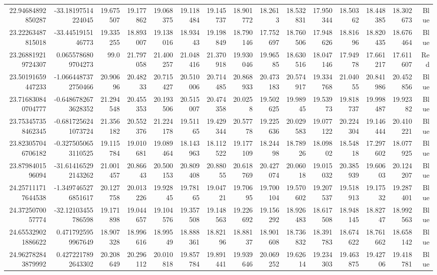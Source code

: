 \begin{center}
\begin{longtable}{rrrrrrrrrrrrrrr}
22.94684892850287 & -33.18197514224045 & 19.675507 & 19.177862 & 19.068375 & 19.118484 & 19.145737 & 18.901772 & 18.2613 & 18.532831 & 17.950344 & 18.50362 & 18.448385 & 18.302673 & Blue \\
23.22263487815018 & -33.4451915146773 & 19.335255 & 18.893007 & 19.138016 & 18.93443 & 19.198849 & 18.790146 & 17.752697 & 18.760506 & 17.948626 & 18.81696 & 18.820435 & 18.676464 & Blue \\
23.268819219724307 & 0.0655786809704273 & 99.0 & 21.797058 & 21.400257 & 21.048416 & 21.370918 & 19.930046 & 19.96585 & 18.630516 & 18.047146 & 17.94978 & 17.661217 & 17.611607 & Red \\
23.50191659447233 & -1.0664487372750466 & 20.90696 & 20.48233 & 20.715427 & 20.510006 & 20.714485 & 20.868933 & 20.473183 & 20.574917 & 19.334768 & 21.04055 & 20.841986 & 20.452856 & Blue \\
23.716830840704777 & -0.6486782673628352 & 21.294548 & 20.455353 & 20.193506 & 20.515007 & 20.474358 & 20.0258 & 19.502625 & 19.98945 & 19.53973 & 19.818737 & 19.998487 & 19.92382 & Blue \\
23.753457358462345 & -0.6817256241073724 & 21.356182 & 20.552376 & 21.224178 & 19.51165 & 19.429344 & 20.57778 & 19.225636 & 20.029583 & 19.077122 & 20.224304 & 19.146444 & 20.410221 & Blue \\
23.823057046706182 & -0.3275050653110525 & 19.115784 & 19.010681 & 19.089464 & 18.143963 & 18.112522 & 19.177109 & 18.24498 & 18.78926 & 18.09802 & 18.54818 & 17.297602 & 18.077925 & Blue \\
23.8798401596094 & -31.614165292143262 & 21.001457 & 20.86643 & 20.500153 & 20.809408 & 20.88055 & 20.618769 & 20.427074 & 20.06018 & 19.015032 & 20.385939 & 19.60603 & 20.124207 & Blue \\
24.257111717644538 & -1.3497465276851617 & 20.127758 & 20.013226 & 19.92845 & 19.78165 & 19.04721 & 19.70695 & 19.700104 & 19.570602 & 19.207537 & 19.518913 & 19.17532 & 19.287401 & Blue \\
24.3725070057774 & -32.12103455786598 & 19.171898 & 19.044657 & 19.104576 & 19.357508 & 19.148563 & 19.226692 & 19.156292 & 18.926483 & 18.617508 & 18.948145 & 18.82747 & 18.992563 & Blue \\
24.655329021886622 & 0.4717925959967649 & 18.907328 & 18.996616 & 18.99549 & 18.888361 & 18.82196 & 18.88137 & 18.901608 & 18.736832 & 18.391783 & 18.674622 & 18.761662 & 18.658142 & Blue \\
24.962782843879992 & 0.4272217892643302 & 20.208649 & 20.296112 & 20.010818 & 19.857784 & 19.891441 & 19.939646 & 20.069252 & 19.62614 & 19.234303 & 19.463875 & 19.42706 & 19.418781 & Blue \\

\end{longtable}
\end{center}
